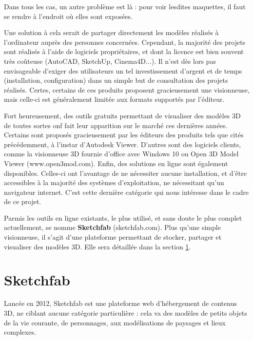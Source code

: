 Dans tous les cas, un autre problème est là : pour voir lesdites maquettes, il faut se rendre à l'endroit où elles sont exposées.

Une solution à cela serait de partager directement les modèles réalisés à l'ordinateur auprès des personnes concernées. Cependant, la majorité des projets sont réalisés à l'aide de logiciels propriétaires, et dont la licence est bien souvent très coûteuse (AutoCAD, SketchUp, Cinema4D...). Il n'est dès lors pas envisageable d'exiger des utilisateurs un tel investissement d'argent et de temps (installation, configuration) dans un simple but de consultation des projets réalisés.
Certes, certains de ces produits proposent gracieusement une visionneuse, mais celle-ci est généralement limitée aux formats supportés par l'éditeur.

Fort heureusement, des outils gratuits permettant de visualiser des modèles 3D de toutes sortes onf fait leur apparition sur le marché ces dernières années. Certains sont proposés gracieusement par les éditeurs des produits tels que cités précédemment, à l'instar d'Autodesk Viewer. D'autres sont des logiciels clients, comme la visionneuse 3D fournie d'office avec Windows 10 ou Open 3D Model Viewer (www.open3mod.com). Enfin, des solutions en ligne sont également disponibles. Celles-ci ont l'avantage de ne nécessiter aucune installation, et d'être accessibles à la majorité des systèmes d'exploitation, ne nécessitant qu'un navigateur internet.
C'est cette dernière catégorie qui nous intéresse dans le cadre de ce projet.

Parmis les outils en ligne existants, le plus utilisé, et sans doute le plus complet actuellement, se nomme \textbf{Sketchfab} (sketchfab.com). Plus qu'une simple visionneuse, il s'agit d'une plateforme permettant de stocker, partager et visualiser des modèles 3D. Elle sera détaillée dans la section \ref{sketchfab}.

\section{Sketchfab} \label{sketchfab}

Lancée en 2012, Sketchfab est une plateforme web d'hébergement de contenus 3D, ne ciblant aucune catégorie particulière : cela va des modèles de petits objets de la vie courante, de personnages, aux modélisations de paysages et lieux complexes.

